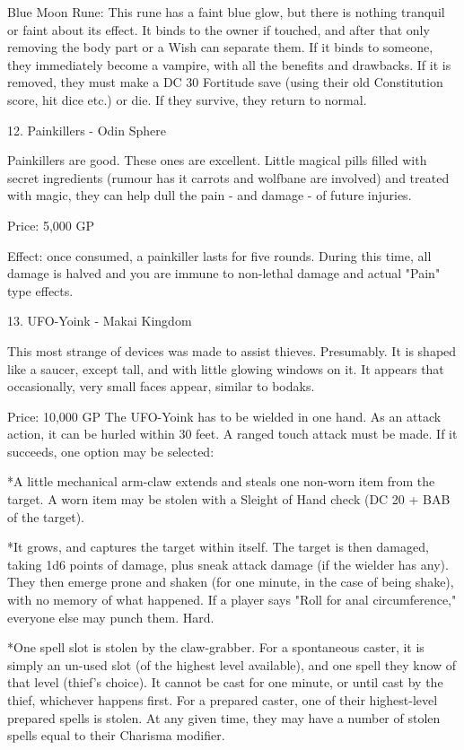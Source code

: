 \begin{multicols}{2}
Blue Moon Rune: This rune has a faint blue glow, but there is nothing tranquil or faint about its effect. It binds to the owner if touched, and after that only removing the body part or a Wish can separate them. If it binds to someone, they immediately become a vampire, with all the benefits and drawbacks. If it is removed, they must make a DC 30 Fortitude save (using their old Constitution score, hit dice etc.) or die. If they survive, they return to normal.


12. Painkillers - Odin Sphere

Painkillers are good. These ones are excellent. Little magical pills filled with secret ingredients (rumour has it carrots and wolfbane are involved) and treated with magic, they can help dull the pain - and damage - of future injuries.

Price: 5,000 GP

Effect: once consumed, a painkiller lasts for five rounds. During this time, all damage is halved and you are immune to non-lethal damage and actual "Pain" type effects.


13. UFO-Yoink - Makai Kingdom

This most strange of devices was made to assist thieves. Presumably. It is shaped like a saucer, except tall, and with little glowing windows on it. It appears that occasionally, very small faces appear, similar to bodaks.

Price: 10,000 GP
The UFO-Yoink has to be wielded in one hand. As an attack action, it can be hurled within 30 feet. A ranged touch attack must be made. If it succeeds, one option may be selected:

*A little mechanical arm-claw extends and steals one non-worn item from the target. A worn item may be stolen with a Sleight of Hand check (DC 20 + BAB of the target).

*It grows, and captures the target within itself. The target is then damaged, taking 1d6 points of damage, plus sneak attack damage (if the wielder has any). They then emerge prone and shaken (for one minute, in the case of being shake), with no memory of what happened. If a player says "Roll for anal circumference," everyone else may punch them. Hard.

*One spell slot is stolen by the claw-grabber. For a spontaneous caster, it is simply an un-used slot (of the highest level available), and one spell they know of that level (thief's choice). It cannot be cast for one minute, or until cast by the thief, whichever happens first. For a prepared caster, one of their highest-level prepared spells is stolen. At any given time, they may have a number of stolen spells equal to their Charisma modifier.



\end{multicols}
